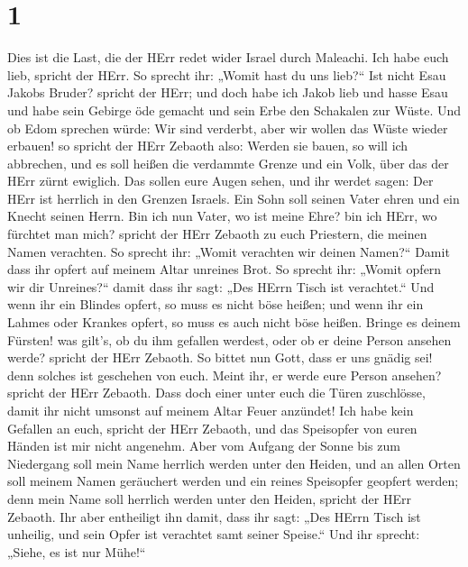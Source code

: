 \hypertarget{section}{%
\section{1}\label{section}}

 Dies ist die Last, die der HErr redet wider Israel durch
Maleachi.  Ich habe euch lieb, spricht der HErr. So sprecht
ihr: „Womit hast du uns lieb?{}`` Ist nicht Esau Jakobs Bruder? spricht
der HErr; und doch habe ich Jakob lieb  und hasse Esau und
habe sein Gebirge öde gemacht und sein Erbe den Schakalen zur Wüste.
 Und ob Edom sprechen würde: Wir sind verderbt, aber wir
wollen das Wüste wieder erbauen! so spricht der HErr Zebaoth also:
Werden sie bauen, so will ich abbrechen, und es soll heißen die
verdammte Grenze und ein Volk, über das der HErr zürnt ewiglich.
 Das sollen eure Augen sehen, und ihr werdet sagen: Der HErr
ist herrlich in den Grenzen Israels.  Ein Sohn soll seinen
Vater ehren und ein Knecht seinen Herrn. Bin ich nun Vater, wo ist meine
Ehre? bin ich HErr, wo fürchtet man mich? spricht der HErr Zebaoth zu
euch Priestern, die meinen Namen verachten. So sprecht ihr: „Womit
verachten wir deinen Namen?{}``  Damit dass ihr opfert auf
meinem Altar unreines Brot. So sprecht ihr: „Womit opfern wir dir
Unreines?{}`` damit dass ihr sagt: „Des HErrn Tisch ist verachtet.``
 Und wenn ihr ein Blindes opfert, so muss es nicht böse
heißen; und wenn ihr ein Lahmes oder Krankes opfert, so muss es auch
nicht böse heißen. Bringe es deinem Fürsten! was gilt's, ob du ihm
gefallen werdest, oder ob er deine Person ansehen werde? spricht der
HErr Zebaoth.  So bittet nun Gott, dass er uns gnädig sei!
denn solches ist geschehen von euch. Meint ihr, er werde eure Person
ansehen? spricht der HErr Zebaoth.  Dass doch einer unter
euch die Türen zuschlösse, damit ihr nicht umsonst auf meinem Altar
Feuer anzündet! Ich habe kein Gefallen an euch, spricht der HErr
Zebaoth, und das Speisopfer von euren Händen ist mir nicht angenehm.
 Aber vom Aufgang der Sonne bis zum Niedergang soll mein
Name herrlich werden unter den Heiden, und an allen Orten soll meinem
Namen geräuchert werden und ein reines Speisopfer geopfert werden; denn
mein Name soll herrlich werden unter den Heiden, spricht der HErr
Zebaoth.  Ihr aber entheiligt ihn damit, dass ihr sagt:
„Des HErrn Tisch ist unheilig, und sein Opfer ist verachtet samt seiner
Speise.``  Und ihr sprecht: „Siehe, es ist nur Mühe!{}``
